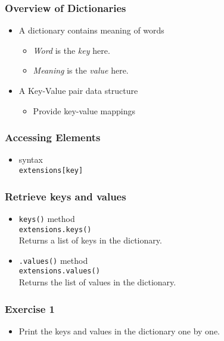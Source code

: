 \documentclass[17pt,compress]{beamer}
\begin{document}
\begin{frame}
\frametitle{Overview of Dictionaries}
\label{sec-4}


\begin{itemize}
\item A dictionary contains meaning of words\pause
	\begin{itemize}
	\item \emph{Word} is the \emph{key} here.
	\item \emph{Meaning} is the \emph{value} here.\pause
	\end{itemize}
\item A Key-Value pair data structure\pause
	\begin{itemize}
	\item Provide key-value mappings
	\end{itemize}
\end{itemize}
\end{frame}
\begin{frame}[fragile]
\frametitle{Accessing Elements}
\label{sec-5}

\begin{itemize}
\item syntax\\
     \texttt{extensions[key]}
\end{itemize}
\end{frame}
\begin{frame}[fragile]
\frametitle{Retrieve keys and values}
\label{sec-6}

\begin{itemize}
\item \texttt{keys()} method\\\pause
\texttt{extensions.keys()}\\
    Returns a list of keys in the dictionary.\pause
\item \texttt{.values()} method\\\pause
\texttt{extensions.values()}\\
    Returns the list of values in the dictionary.
\end{itemize}
\end{frame}
\begin{frame}
\frametitle{Exercise 1}
\label{sec-7}

\begin{itemize}
\item Print the keys and values in the dictionary one by one.
\end{itemize}
\end{frame}
\end{document}
